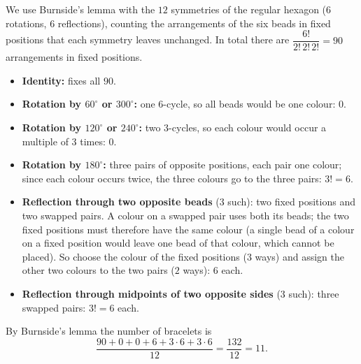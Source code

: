 We use Burnside's lemma with the $12$ symmetries of the regular hexagon (6 rotations, 6 reflections), counting the arrangements of the six beads in fixed positions that each symmetry leaves unchanged. In total there are $\dfrac{6!}{2!\,2!\,2!}=90$ arrangements in fixed positions.
\begin{itemize}
\item \textbf{Identity:} fixes all $90$.
\item \textbf{Rotation by $60^\circ$ or $300^\circ$:} one $6$-cycle, so all beads would be one colour: $0$.
\item \textbf{Rotation by $120^\circ$ or $240^\circ$:} two $3$-cycles, so each colour would occur a multiple of $3$ times: $0$.
\item \textbf{Rotation by $180^\circ$:} three pairs of opposite positions, each pair one colour; since each colour occurs twice, the three colours go to the three pairs: $3!=6$.
\item \textbf{Reflection through two opposite beads} ($3$ such): two fixed positions and two swapped pairs. A colour on a swapped pair uses both its beads; the two fixed positions must therefore have the same colour (a single bead of a colour on a fixed position would leave one bead of that colour, which cannot be placed). So choose the colour of the fixed positions ($3$ ways) and assign the other two colours to the two pairs ($2$ ways): $6$ each.
\item \textbf{Reflection through midpoints of two opposite sides} ($3$ such): three swapped pairs: $3!=6$ each.
\end{itemize}
By Burnside's lemma the number of bracelets is
\[
\dfrac{90+0+0+6+3\cdot6+3\cdot6}{12}=\dfrac{132}{12}=\boxed{11}.
\]

